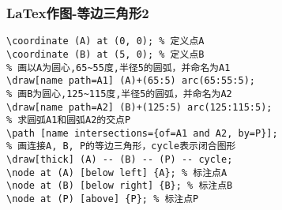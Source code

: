 \begin{frame}[fragile]
\frametitle{LaTex作图-等边三角形2}

\begin{verbatim}
\coordinate (A) at (0, 0); % 定义点A
\coordinate (B) at (5, 0); % 定义点B
% 画以A为圆心,65~55度,半径5的圆弧，并命名为A1
\draw[name path=A1] (A)+(65:5) arc(65:55:5);
% 画B为圆心,125~115度,半径5的圆弧，并命名为A2
\draw[name path=A2] (B)+(125:5) arc(125:115:5);
% 求圆弧A1和圆弧A2的交点P
\path [name intersections={of=A1 and A2, by=P}]; 
% 画连接A, B, P的等边三角形，cycle表示闭合图形
\draw[thick] (A) -- (B) -- (P) -- cycle; 
\node at (A) [below left] {A}; % 标注点A
\node at (B) [below right] {B}; % 标注点B
\node at (P) [above] {P}; % 标注点P
\end{verbatim}
\end{frame}
